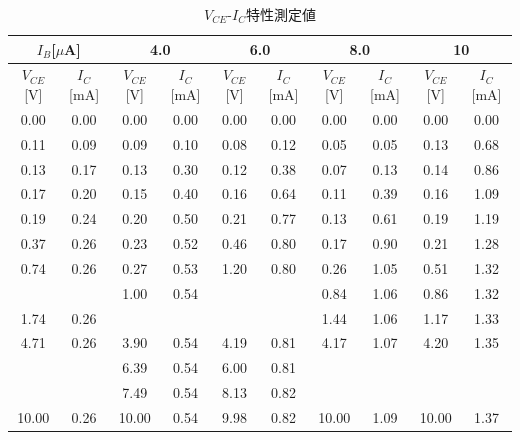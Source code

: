 \documentclass[uplatex,dvipdfmx,a4paper,js=standard, titlepage]{bxjsarticle}
\begin{document}
            \begin{table}[ht]
                \begin{center}
                    \caption{$V_{CE}$-$I_C$特性測定値}
                    \label{tab:VCE-IC}
                    \renewcommand{\arraystretch}{0.8}
                    \begin{tabular}[t]{c|c||c|c||c|c||c|c||c|c}
                        \multicolumn{2}{c||}{$I_B$[$\mu$A] \qquad 2.0 \qquad} & \multicolumn{2}{c||}{4.0} &
                            \multicolumn{2}{c||}{6.0} & \multicolumn{2}{c||}{8.0} & \multicolumn{2}{c}{10} \\ \hline
                         $V_{CE}$[V] & $I_C$[mA] & $V_{CE}$[V] & $I_C$[mA] & $V_{CE}$[V]
                            & $I_C$[mA] & $V_{CE}$[V] & $I_C$[mA] & $V_{CE}$[V] & $I_C$[mA] \\ \hline \hline
                         0.00 & 0.00 & 0.00 & 0.00 & 0.00 & 0.00 & 0.00 & 0.00 & 0.00 & 0.00 \\
                         0.11 & 0.09 & 0.09 & 0.10 & 0.08 & 0.12 & 0.05 & 0.05 & 0.13 & 0.68 \\
                         0.13 & 0.17 & 0.13 & 0.30 & 0.12 & 0.38 & 0.07 & 0.13 & 0.14 & 0.86 \\
                         0.17 & 0.20 & 0.15 & 0.40 & 0.16 & 0.64 & 0.11 & 0.39 & 0.16 & 1.09 \\
                         0.19 & 0.24 & 0.20 & 0.50 & 0.21 & 0.77 & 0.13 & 0.61 & 0.19 & 1.19 \\
                         0.37 & 0.26 & 0.23 & 0.52 & 0.46 & 0.80 & 0.17 & 0.90 & 0.21 & 1.28 \\
                         0.74 & 0.26 & 0.27 & 0.53 & 1.20 & 0.80 & 0.26 & 1.05 & 0.51 & 1.32 \\
                          &  & 1.00 & 0.54 &  &  & 0.84 & 1.06 & 0.86 & 1.32 \\
                         1.74 & 0.26 &  &  &  &  & 1.44 & 1.06 & 1.17 & 1.33 \\
                         4.71 & 0.26 & 3.90 & 0.54 & 4.19 & 0.81 & 4.17 & 1.07 & 4.20 & 1.35 \\
                          &  & 6.39 & 0.54 & 6.00 & 0.81 &  &  &  &  \\
                          &  & 7.49 & 0.54 & 8.13 & 0.82 &  &  &  &  \\
                         10.00 & 0.26 & 10.00 & 0.54 & 9.98 & 0.82 & 10.00 & 1.09 & 10.00 & 1.37
                     \end{tabular}
                \end{center}
            \end{table}
\end{document}
